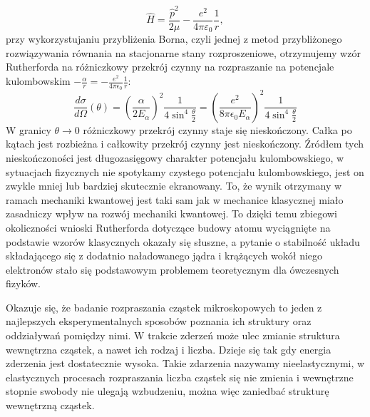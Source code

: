 \documentclass[11pt]{book}
\theoremstyle{definition}
\begin{document}
%
\begin{equation}
\hat{H} = \frac{\hat{p}^2}{2\mu} - \frac{e^2}{4\pi\varepsilon_0} \frac{1}{r},
\end{equation}
%
przy wykorzystujaniu przybliżenia Borna, czyli jednej z metod przybliżonego rozwiązywania równania na stacjonarne stany rozproszeniowe, otrzymujemy wzór Rutherforda  \cite{Jaskolski..MQ}  na różniczkowy przekrój czynny na rozpraszanie na potencjale kulombowskim $-\frac{\alpha}{r} = -\frac{e^2}{4\pi \epsilon_0}\frac{1}{r}$:
%
\begin{equation}
\frac{d\sigma}{d\Omega}\left(\theta\right) = \left(\frac{\alpha}{2 E_{\alpha}} \right)^2 \frac{1}{4\sin^4 \frac{\theta}{2}} = \left(\frac{e^2}{8 \pi \epsilon_0  E_{\alpha}} \right)^2 \frac{1}{4\sin^4 \frac{\theta}{2}} \label{eq:ruth}
\end{equation}
%
W granicy $\theta \rightarrow 0$ różniczkowy przekrój czynny staje się nieskończony. Całka po kątach jest rozbieżna i całkowity przekrój czynny jest nieskończony. Źródłem tych nieskończoności jest długozasięgowy charakter potencjału kulombowskiego, w sytuacjach fizycznych nie spotykamy czystego potencjału kulombowskiego, jest on zwykle mniej lub bardziej skutecznie ekranowany.
%
To, że wynik otrzymany w ramach mechaniki kwantowej jest taki sam jak w mechanice klasycznej miało zasadniczy wpływ na rozwój mechaniki kwantowej. To dzięki temu zbiegowi okoliczności wnioski Rutherforda dotyczące budowy atomu wyciągnięte na podstawie wzorów klasycznych okazały się słuszne, a pytanie o stabilność układu składającego się z dodatnio naładowanego jądra i krążących wokół niego elektronów stało się podstawowym problemem teoretycznym dla ówczesnych fizyków.
%

Okazuje się, że badanie rozpraszania cząstek mikroskopowych to jeden z najlepszych eksperymentalnych sposobów poznania ich struktury oraz oddziaływań pomiędzy nimi. W trakcie zderzeń może ulec zmianie struktura wewnętrzna cząstek, a nawet ich rodzaj i liczba. Dzieje się tak gdy energia zderzenia jest dostatecznie wysoka. Takie zdarzenia nazywamy nieelastycznymi, w elastycznych procesach rozpraszania liczba cząstek się nie zmienia i wewnętrzne stopnie swobody nie ulegają wzbudzeniu, można więc zaniedbać strukturę wewnętrzną cząstek. 
\end{document}
